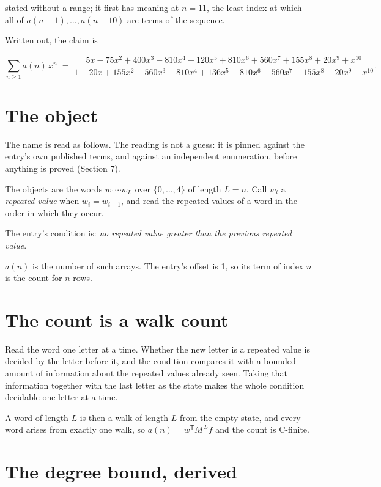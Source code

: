 \documentclass[11pt]{article}
\theoremstyle{definition}
\begin{document}
stated without a range; it first has meaning at $n = 11$, the least index at which all of $a(n-1),\dots,a(n-10)$ are terms of the sequence.

Written out, the claim is

\[\sum_{n \ge 1} a(n)\,x^n \;=\; \frac{5x - 75x^{2} + 400x^{3} - 810x^{4} + 120x^{5} + 810x^{6} + 560x^{7} + 155x^{8} + 20x^{9} + x^{10}}{1 - 20x + 155x^{2} - 560x^{3} + 810x^{4} + 136x^{5} - 810x^{6} - 560x^{7} - 155x^{8} - 20x^{9} - x^{10}}.\]

\section{The object}

The name is read as follows. The reading is not a guess: it is pinned against the entry's own published terms, and against an independent enumeration, before anything is proved (Section 7).

The objects are the words $w_1\cdots w_L$ over $\{0,\dots,4\}$ of length $L = n$. Call $w_i$ a {\itshape repeated value} when $w_i = w_{i-1}$, and read the repeated values of a word in the order in which they occur.

The entry's condition is: {\itshape no repeated value greater than the previous repeated value}.

$a(n)$ is the number of such arrays. The entry's offset is 1, so its term of index $n$ is the count for $n$ rows.

\section{The count is a walk count}

Read the word one letter at a time. Whether the new letter is a repeated value is decided by the letter before it, and the condition compares it with a bounded amount of information about the repeated values already seen. Taking that information together with the last letter as the state makes the whole condition decidable one letter at a time.

A word of length $L$ is then a walk of length $L$ from the empty state, and every word arises from exactly one walk, so $a(n) = w^{\mathsf T}M^{\,L}f$ and the count is C-finite.

\section{The degree bound, derived}
\end{document}

